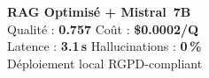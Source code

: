 \documentclass[a0paper,portrait,25pt]{tikzposter}
\begin{document}
\begin{columns}
{  \vspace{0.5cm}
  \begin{tcolorbox}[recommande]
    \centering
    \large\textbf{RAG Optimis\'e + Mistral~7B}\\[0.4em]
    \normalsize
    Qualit\'e : \textbf{0.757} \quad
    Co\^ut : \textbf{\$0.0002/Q}\\[0.2em]
    Latence : \textbf{3.1\,s} \quad
    Hallucinations : \textbf{0\,\%}\\[0.2em]
    \small D\'eploiement local RGPD-compliant
  \end{tcolorbox}
}

\end{columns}
\end{document}

